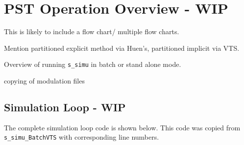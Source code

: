 \chapter{PST Operation Overview - WIP}

This is likely to include a flow chart/ multiple flow charts.

Mention partitioned explicit method via Huen's, partitioned implicit via VTS.

Overview of running \verb|s_simu| in batch or stand alone mode.

copying of modulation files

\section{Simulation Loop - WIP}
The complete simulation loop code is shown below.
This code was copied from \verb|s_simu_BatchVTS| with corresponding line numbers.

